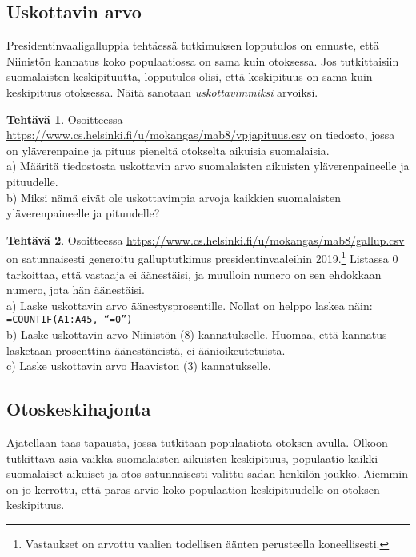 \documentclass[12pt,leqno,a4paper,oneside]{amsart}
\theoremstyle{definition}
\newtheorem{exercise}{Tehtävä}
\theoremstyle{remark}
\numberwithin{equation}{section}
\begin{document}
\subsection{Uskottavin arvo}

Presidentinvaaligalluppia tehtäessä
tutkimuksen lopputulos on ennuste, että Niinistön kannatus koko populaatiossa on sama kuin otoksessa. Jos tutkittaisiin suomalaisten
keskipituutta, lopputulos olisi, että keskipituus on sama kuin keskipituus otoksessa. Näitä sanotaan \emph{uskottavimmiksi} arvoiksi.

\begin{exercise}
 Osoitteessa \url{https://www.cs.helsinki.fi/u/mokangas/mab8/vpjapituus.csv} on tiedosto, jossa on yläverenpaine ja pituus pieneltä otokselta
 aikuisia suomalaisia. \\
 a) Määritä tiedostosta uskottavin arvo suomalaisten aikuisten yläveren\-paineelle ja pituudelle.\\
 b) Miksi nämä eivät ole uskottavimpia arvoja kaikkien suomalaisten yläverenpaineelle ja pituudelle?
\end{exercise}

\begin{exercise}
 Osoitteessa \url{https://www.cs.helsinki.fi/u/mokangas/mab8/gallup.csv} on satunnaisesti generoitu galluptutkimus presidentinvaaleihin 
 2019.\footnote{Vastaukset on arvottu vaalien todellisen äänten perusteella koneellisesti.} Listassa 0 tarkoittaa, että vastaaja ei äänestäisi,
 ja muulloin numero on sen ehdokkaan numero, jota hän äänestäisi.\\ 
 a) Laske uskottavin arvo äänestysprosentille. Nollat on helppo laskea näin: \texttt{=COUNTIF(A1:A45, ``=0'')}\\
 b) Laske uskottavin arvo Niinistön (8) kannatukselle. Huomaa, että kannatus lasketaan prosenttina äänestäneistä, ei äänioikeutetuista.\\
 c) Laske uskottavin arvo Haaviston (3) kannatukselle.
\end{exercise}




\subsection{Otoskeskihajonta}

Ajatellaan taas tapausta, jossa tutkitaan po\-pu\-laa\-ti\-o\-ta otoksen avulla. Olkoon tutkittava asia vaikka suomalaisten aikuisten
keskipituus, populaatio kaikki suomalaiset aikuiset ja otos satunnaisesti valittu sadan henkilön joukko. Aiemmin on jo kerrottu, 
että paras arvio koko populaation keskipituudelle on otoksen keski\-pituus. 
\end{document}
